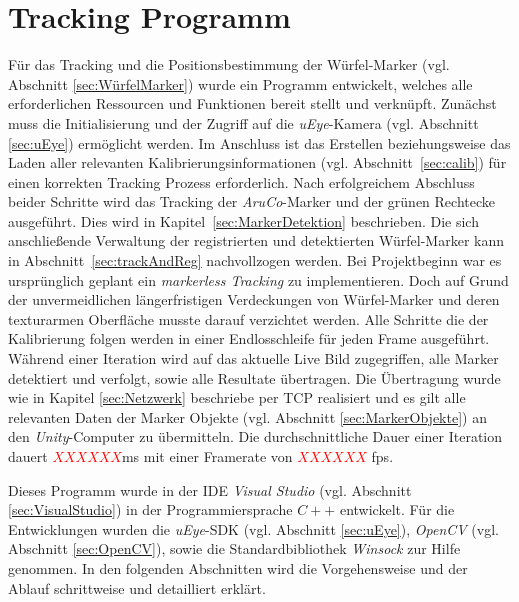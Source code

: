 \section{Tracking Programm} \label{sec:Tracking}
Für das Tracking und die Positionsbestimmung der Würfel-Marker (vgl. Abschnitt \ref{sec:WürfelMarker}) wurde ein Programm entwickelt, welches alle erforderlichen Ressourcen und Funktionen bereit stellt und verknüpft. Zunächst muss die Initialisierung und der Zugriff auf die \textit{uEye}-Kamera (vgl. Abschnitt \ref{sec:uEye}) ermöglicht werden. Im Anschluss ist das Erstellen beziehungsweise das Laden aller relevanten Kalibrierungsinformationen (vgl. Abschnitt~\ref{sec:calib}) für einen korrekten Tracking Prozess erforderlich. Nach erfolgreichem Abschluss beider Schritte wird das Tracking der \textit{AruCo}-Marker und der grünen Rechtecke ausgeführt. Dies wird in Kapitel~\ref{sec:MarkerDetektion} beschrieben. Die sich anschließende Verwaltung der registrierten und detektierten Würfel-Marker kann in Abschnitt~\ref{sec:trackAndReg} nachvollzogen werden. Bei Projektbeginn war es ursprünglich geplant ein \textit{markerless Tracking} zu implementieren. Doch auf Grund der unvermeidlichen längerfristigen Verdeckungen von Würfel-Marker und deren texturarmen Oberfläche musste darauf verzichtet werden.
Alle Schritte die der Kalibrierung folgen werden in einer Endlosschleife für jeden Frame ausgeführt. Während einer Iteration wird auf das aktuelle Live Bild zugegriffen, alle Marker detektiert und verfolgt, sowie alle Resultate übertragen. Die Übertragung wurde wie in Kapitel \ref{sec:Netzwerk} beschriebe per TCP realisiert und es gilt alle relevanten Daten der Marker Objekte (vgl. Abschnitt \ref{sec:MarkerObjekte}) an den \textit{Unity}-Computer zu übermitteln. Die durchschnittliche Dauer einer Iteration dauert \textcolor{red}{$XXXXXX$}ms mit einer Framerate von \textcolor{red}{$XXXXXX$} fps. 

Dieses Programm wurde in der IDE \textit{Visual Studio} (vgl. Abschnitt \ref{sec:VisualStudio}) in der Programmiersprache $C++$ entwickelt. Für die Entwicklungen wurden die \textit{uEye}-SDK (vgl. Abschnitt \ref{sec:uEye}), \textit{OpenCV} (vgl. Abschnitt \ref{sec:OpenCV}), sowie die Standardbibliothek \textit{Winsock} zur Hilfe genommen. In den folgenden Abschnitten wird die Vorgehensweise und der Ablauf schrittweise und detailliert erklärt.

